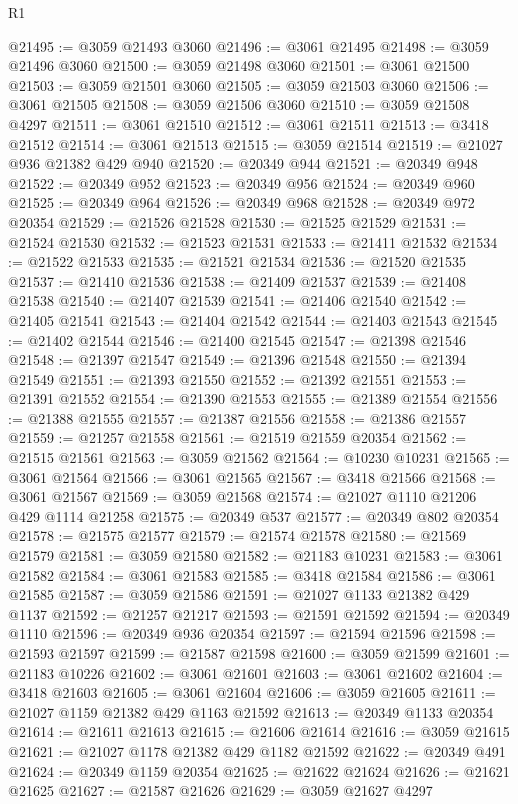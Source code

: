 \begin{lexlean}{R1}
\begin{coremodule}
@21495 := @3059 @21493 @3060
@21496 := @3061 @21495
@21498 := @3059 @21496 @3060
@21500 := @3059 @21498 @3060
@21501 := @3061 @21500
@21503 := @3059 @21501 @3060
@21505 := @3059 @21503 @3060
@21506 := @3061 @21505
@21508 := @3059 @21506 @3060
@21510 := @3059 @21508 @4297
@21511 := @3061 @21510
@21512 := @3061 @21511
@21513 := @3418 @21512
@21514 := @3061 @21513
@21515 := @3059 @21514
@21519 := @21027 @936 @21382 @429 @940
@21520 := @20349 @944
@21521 := @20349 @948
@21522 := @20349 @952
@21523 := @20349 @956
@21524 := @20349 @960
@21525 := @20349 @964
@21526 := @20349 @968
@21528 := @20349 @972 @20354
@21529 := @21526 @21528
@21530 := @21525 @21529
@21531 := @21524 @21530
@21532 := @21523 @21531
@21533 := @21411 @21532
@21534 := @21522 @21533
@21535 := @21521 @21534
@21536 := @21520 @21535
@21537 := @21410 @21536
@21538 := @21409 @21537
@21539 := @21408 @21538
@21540 := @21407 @21539
@21541 := @21406 @21540
@21542 := @21405 @21541
@21543 := @21404 @21542
@21544 := @21403 @21543
@21545 := @21402 @21544
@21546 := @21400 @21545
@21547 := @21398 @21546
@21548 := @21397 @21547
@21549 := @21396 @21548
@21550 := @21394 @21549
@21551 := @21393 @21550
@21552 := @21392 @21551
@21553 := @21391 @21552
@21554 := @21390 @21553
@21555 := @21389 @21554
@21556 := @21388 @21555
@21557 := @21387 @21556
@21558 := @21386 @21557
@21559 := @21257 @21558
@21561 := @21519 @21559 @20354
@21562 := @21515 @21561
@21563 := @3059 @21562
@21564 := @10230 @10231
@21565 := @3061 @21564
@21566 := @3061 @21565
@21567 := @3418 @21566
@21568 := @3061 @21567
@21569 := @3059 @21568
@21574 := @21027 @1110 @21206 @429 @1114 @21258
@21575 := @20349 @537
@21577 := @20349 @802 @20354
@21578 := @21575 @21577
@21579 := @21574 @21578
@21580 := @21569 @21579
@21581 := @3059 @21580
@21582 := @21183 @10231
@21583 := @3061 @21582
@21584 := @3061 @21583
@21585 := @3418 @21584
@21586 := @3061 @21585
@21587 := @3059 @21586
@21591 := @21027 @1133 @21382 @429 @1137
@21592 := @21257 @21217
@21593 := @21591 @21592
@21594 := @20349 @1110
@21596 := @20349 @936 @20354
@21597 := @21594 @21596
@21598 := @21593 @21597
@21599 := @21587 @21598
@21600 := @3059 @21599
@21601 := @21183 @10226
@21602 := @3061 @21601
@21603 := @3061 @21602
@21604 := @3418 @21603
@21605 := @3061 @21604
@21606 := @3059 @21605
@21611 := @21027 @1159 @21382 @429 @1163 @21592
@21613 := @20349 @1133 @20354
@21614 := @21611 @21613
@21615 := @21606 @21614
@21616 := @3059 @21615
@21621 := @21027 @1178 @21382 @429 @1182 @21592
@21622 := @20349 @491
@21624 := @20349 @1159 @20354
@21625 := @21622 @21624
@21626 := @21621 @21625
@21627 := @21587 @21626
@21629 := @3059 @21627 @4297

\end{coremodule}
\end{lexlean}
